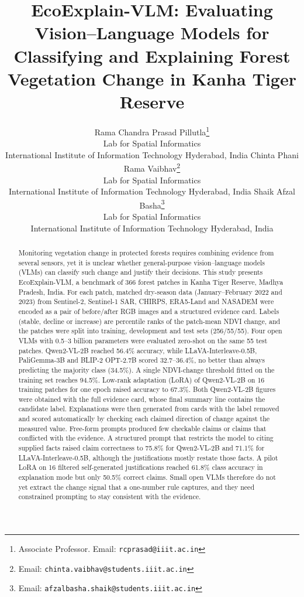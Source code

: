 \documentclass[11pt]{article}
\title{EcoExplain-VLM: Evaluating Vision--Language Models for Classifying
and Explaining Forest Vegetation Change in Kanha Tiger Reserve}
\author{
Rama Chandra Prasad Pillutla\thanks{Associate Professor. Email:
\texttt{rcprasad@iiit.ac.in}} \\
Lab for Spatial Informatics \\
International Institute of Information Technology Hyderabad, India
\And
Chinta Phani Rama Vaibhav\thanks{Email:
\texttt{chinta.vaibhav@students.iiit.ac.in}} \\
Lab for Spatial Informatics \\
International Institute of Information Technology Hyderabad, India
\And
Shaik Afzal Basha\thanks{Email:
\texttt{afzalbasha.shaik@students.iiit.ac.in}} \\
Lab for Spatial Informatics \\
International Institute of Information Technology Hyderabad, India
}
\begin{document}
\maketitle


\begin{abstract}
Monitoring vegetation change in protected forests requires combining
evidence from several sensors, yet it is unclear whether general-purpose
vision--language models (VLMs) can classify such change and justify
their decisions. This study presents EcoExplain-VLM, a benchmark of 366
forest patches in Kanha Tiger Reserve, Madhya Pradesh, India. For each
patch, matched dry-season data (January--February 2022 and 2023) from
Sentinel-2, Sentinel-1 SAR, CHIRPS, ERA5-Land and NASADEM were encoded
as a pair of before/after RGB images and a structured evidence card.
Labels (stable, decline or increase) are percentile ranks of the
patch-mean NDVI change, and the patches were split into training,
development and test sets (256/55/55). Four open VLMs with 0.5--3
billion parameters were evaluated zero-shot on the same 55 test
patches. Qwen2-VL-2B reached 56.4\% accuracy, while LLaVA-Interleave-0.5B,
PaliGemma-3B and BLIP-2 OPT-2.7B scored 32.7--36.4\%, no better than
always predicting the majority class (34.5\%). A single NDVI-change
threshold fitted on the training set reaches 94.5\%. Low-rank adaptation
(LoRA) of Qwen2-VL-2B on 16 training patches for one epoch raised
accuracy to 67.3\%. Both Qwen2-VL-2B figures were obtained with the full
evidence card, whose final summary line contains the candidate label.
Explanations were then generated from cards with the label removed and
scored automatically by checking each claimed direction of change against
the measured value. Free-form prompts produced few checkable claims or
claims that conflicted with the evidence. A structured prompt that
restricts the model to citing supplied facts raised claim correctness to
75.8\% for Qwen2-VL-2B and 71.1\% for LLaVA-Interleave-0.5B, although
the justifications mostly restate those facts. A pilot LoRA on 16
filtered self-generated justifications reached 61.8\% class accuracy in
explanation mode but only 50.5\% correct claims. Small open VLMs
therefore do not yet extract the change signal that a one-number rule
captures, and they need constrained prompting to stay consistent with
the evidence.
\end{abstract}
\end{document}
